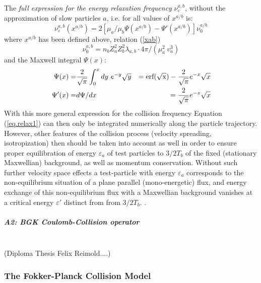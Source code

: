 \vspace{1cm}
The \emph{full expression for the energy relaxation frequency }$\nu_\varepsilon^{a,b}$, without the approximation of slow particles $a$, i.e. for all values of $x^{a/b}$ is:
\begin{equation}\label{eps2}
\nu_\varepsilon^{a,b}(x^{a/b}) =2 \left[\mu_a/\mu_b \Psi(x^{a/b}) - \Psi'(x^{a/b})\right] \nu_0^{a/b}
\end{equation}
where $x^{a/b}$ has been defined above, relation (\ref{xab})
\begin{equation}
\nu_0^{a,b}  =  n_b Z_a^2 Z_b^2\lambda_{a,b}\cdot 4 \pi  /(\mu_a^2~  v_a^3)
\end{equation}
 and the Maxwell integral $\Psi(x)$:
\begin{eqnarray}
\Psi(x) =& \frac{2}{\sqrt{\pi}}\int_0^x dy~e^{-y} \sqrt{y} &= {\rm erf(\sqrt{x})}-\frac{2}{\sqrt{\pi}}e^{-x}\sqrt{x}\\
\Psi'(x) =& d\Psi/dx&= \frac{2}{\sqrt{\pi}}e^{-x}\sqrt{x}
\end{eqnarray}
With this more general expression for the collision frequency Equation (\ref{eq.relax1})
can then only be integrated numerically  along the particle trajectory.
However, other features of the collision process (velocity spreading, isotropization)
then should be taken into account as well in order
to ensure proper equilibration of energy $\varepsilon_a$ of test particles
to $3/2 T_b$ of the fixed (stationary Maxwellian) background, as well as momentum conservation.
Without such further velocity space effects
a test-particle with energy $\varepsilon_a$ corresponds to the non-equilibrium situation
of a plane parallel (mono-energetic) flux, and energy exchange of this non-equilibrium flux
with a Maxwellian background
vanishes at a critical energy $\varepsilon'$ distinct from from $3/2 T_b$.
\cite[paragraph 19]{kn:Trubnikov}.
\subparagraph{A2: BGK Coulomb-Collision operator}\hfill \\
(Diploma Thesis Felix Reimold....)
\subsubsection{The Fokker-Planck Collision Model}
